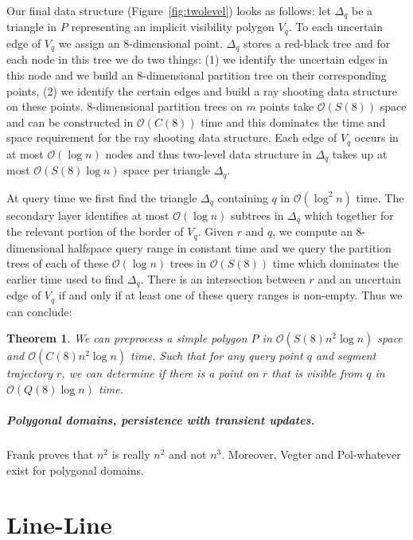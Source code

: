 \documentclass[a4paper, UKenglish]{paper}
\newtheorem{theorem}{Theorem}
\begin{document}
Our final data structure (Figure~\ref{fig:twolevel}) looks as follows: let $\Delta_q$ be a triangle in $P$ representing an implicit visibility polygon $V_q$. To each uncertain edge of $V_q$ we assign an $8$-dimensional point. $\Delta_q$ stores a red-black tree and for each node in this tree we do two things: (1) we identify the uncertain edges in this node and we build an $8$-dimensional partition tree on their corresponding points, (2) we identify the certain edges and build a ray shooting data structure on these points.
$8$-dimensional partition trees on $m$ points take $\mathcal{O}(S(8))$ space and can be constructed in $\mathcal{O}(C(8))$ time and this dominates the time and space requirement for the ray shooting data structure. Each edge of $V_q$ occurs in at most $\mathcal{O}(\log n)$ nodes and thus two-level data structure in $\Delta_q$ takes up at most $\mathcal{O}(S(8) \log n)$ space per triangle $\Delta_q$.

At query time we first find the triangle $\Delta_q$ containing $q$ in $\mathcal{O}(\log^2 n)$ time. The secondary layer identifies at most $\mathcal{O}(\log n)$ subtrees in $\Delta_q$ which together for the relevant portion of the border of $V_q$. Given $r$ and $q$, we compute an $8$-dimensional halfspace query range in constant time and we query the partition trees of each of these $\mathcal{O}(\log n)$ trees in $\mathcal{O}(S(8))$ time which dominates the earlier time used to find $\Delta_q$. There is an intersection between $r$ and an uncertain edge of $V_q$ if and only if at least one of these query ranges is non-empty.  Thus we can conclude:

\begin{theorem}
We can preprocess a simple polygon $P$ in $\mathcal{O}(S(8) n^2 \log n)$ space and $\mathcal{O}(C(8) n^2 \log n)$ time. Such that for any query point $q$ and segment trajectory $r$, we can determine if there is a point on $r$ that is visible from $q$ in $\mathcal{O}(Q(8) \log n)$ time.
\end{theorem}




\subparagraph{Polygonal domains, persistence with transient updates.}

Frank proves that $n^2$ is really $n^2$ and not $n^3$. Moreover, Vegter and Pol-whatever exist for polygonal domains.


\section{Line-Line}
\label{sec:lineline}
\end{document}
